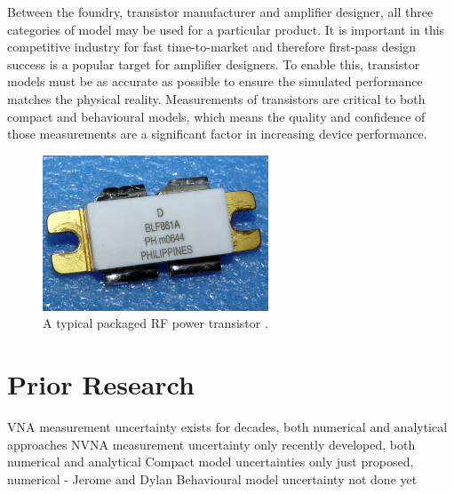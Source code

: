 \documentclass[../thesis/thesis.tex]{subfiles}
\begin{document}
\begin{refsection}
Between the foundry, transistor manufacturer and amplifier designer, all three categories of model may be used for a particular product. It is important in this competitive industry for fast time-to-market and therefore first-pass design success is a popular target for amplifier designers. To enable this, transistor models must be as accurate as possible to ensure the simulated performance matches the physical reality. Measurements of transistors are critical to both compact and behavioural models, which means the quality and confidence of those measurements are a significant factor in increasing device performance.



\begin{figure}
	\centering
	\includegraphics[width=0.6\textwidth]{ch1_rfpa}
	\caption{A typical packaged RF power transistor \cite{blf861a}.}
	\label{ch1_fig_rfpa}
\end{figure}

\section{Prior Research}
VNA measurement uncertainty exists for decades, both numerical and analytical approaches
NVNA measurement uncertainty only recently developed, both numerical and analytical
Compact model uncertainties only just proposed, numerical - Jerome and Dylan
Behavioural model uncertainty not done yet

\end{refsection}
\end{document}
